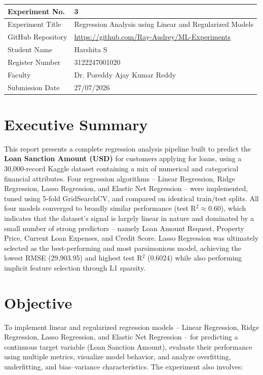 \documentclass[12pt,a4paper]{article}
\begin{document}
\begin{tabular}{|p{4cm}|p{11cm}|}
\hline
Experiment No. & 3 \\ \hline
Experiment Title & Regression Analysis using Linear and Regularized Models \\ \hline
GitHub Repository & \url{https://github.com/Ray-Audrey/ML-Experiments} \\ \hline
Student Name & Harshita S \\ \hline
Register Number & 3122247001020\\ \hline
Faculty & Dr. Poreddy Ajay Kumar Reddy \\ \hline
Submission Date & 27/07/2026\\ \hline
\end{tabular}

\section{Executive Summary}

This report presents a complete regression analysis pipeline built to predict the \textbf{Loan Sanction Amount (USD)} for customers applying for loans, using a 30{,}000-record Kaggle dataset containing a mix of numerical and categorical financial attributes. Four regression algorithms -- Linear Regression, Ridge Regression, Lasso Regression, and Elastic Net Regression -- were implemented, tuned using 5-fold GridSearchCV, and compared on identical train/test splits. All four models converged to broadly similar performance (test R$^2 \approx 0.60$), which indicates that the dataset's signal is largely linear in nature and dominated by a small number of strong predictors -- namely Loan Amount Request, Property Price, Current Loan Expenses, and Credit Score. Lasso Regression was ultimately selected as the best-performing and most parsimonious model, achieving the lowest RMSE (29{,}903.95) and highest test R$^2$ (0.6024) while also performing implicit feature selection through L1 sparsity.

\section{Objective}

To implement linear and regularized regression models -- Linear Regression, Ridge Regression, Lasso Regression, and Elastic Net Regression -- for predicting a continuous target variable (Loan Sanction Amount), evaluate their performance using multiple metrics, visualize model behavior, and analyze overfitting, underfitting, and bias--variance characteristics. The experiment also involves:
\end{document}
